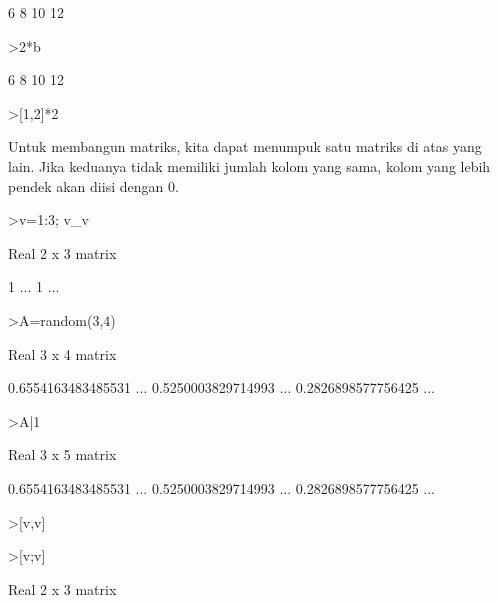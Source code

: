 \documentclass[a4paper,10pt]{article}
\begin{document}
\begin{eulernotebook}
\begin{eulercomment}
\begin{eulercomment}
\begin{eulercomment}
\begin{eulercomment}
\begin{euleroutput}
                        6                       8 
                       10                      12 
\end{euleroutput}
\begin{eulerprompt}
>2*b
\end{eulerprompt}
\begin{euleroutput}
                        6                       8 
                       10                      12 
\end{euleroutput}
\begin{eulerprompt}
>[1,2]*2
\end{eulerprompt}
\begin{euleroutput}
  [2,  4]
\end{euleroutput}
\begin{eulercomment}
Untuk membangun matriks, kita dapat menumpuk satu matriks di atas yang
lain. Jika keduanya tidak memiliki jumlah kolom yang sama, kolom yang
lebih pendek akan diisi dengan 0.
\end{eulercomment}
\begin{eulerprompt}
>v=1:3; v_v
\end{eulerprompt}
\begin{euleroutput}
  Real 2 x 3 matrix
  
                        1     ...
                        1     ...
\end{euleroutput}
\begin{eulerprompt}
>A=random(3,4)
\end{eulerprompt}
\begin{euleroutput}
  Real 3 x 4 matrix
  
       0.6554163483485531     ...
       0.5250003829714993     ...
       0.2826898577756425     ...
\end{euleroutput}
\begin{eulerprompt}
>A|1
\end{eulerprompt}
\begin{euleroutput}
  Real 3 x 5 matrix
  
       0.6554163483485531     ...
       0.5250003829714993     ...
       0.2826898577756425     ...
\end{euleroutput}
\begin{eulerprompt}
>[v,v]
\end{eulerprompt}
\begin{euleroutput}
  [1,  2,  3,  1,  2,  3]
\end{euleroutput}
\begin{eulerprompt}
>[v;v]
\end{eulerprompt}
\begin{euleroutput}
  Real 2 x 3 matrix
  

\end{euleroutput}
\end{eulercomment}
\end{eulercomment}
\end{eulercomment}
\end{eulercomment}
\end{eulernotebook}
\end{document}
